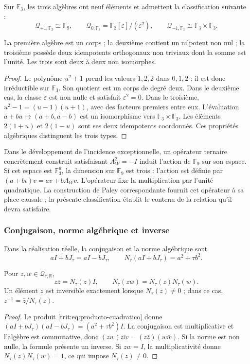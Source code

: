 Sur \(\mathbb F_3\), les trois algèbres ont neuf éléments et admettent
la classification suivante :
\[
 \mathcal Q_{+1,\mathbb F_3}\cong\mathbb F_9,\qquad
 \mathcal Q_{0,\mathbb F_3}=\mathbb F_3[\varepsilon]/(\varepsilon^2),
 \qquad
 \mathcal Q_{-1,\mathbb F_3}\cong\mathbb F_3\times\mathbb F_3.
\]

\begin{proposicion}
\label{trit:prop:tres-tipos}
La première algèbre est un corps ; la deuxième contient un nilpotent non
nul ; la troisième possède deux idempotents orthogonaux non triviaux dont la
somme est l'unité. Les trois sont deux à deux non isomorphes.
\end{proposicion}
\begin{proof}
Le polynôme \(u^2+1\) prend les valeurs \(1,2,2\) dans \(0,1,2\) ;
il est donc irréductible sur \(\mathbb F_3\). Son quotient est un
corps de degré deux. Dans le deuxième cas, la classe \(\varepsilon\) est
non nulle et satisfait \(\varepsilon^2=0\). Dans le troisième,
\(u^2-1=(u-1)(u+1)\), avec des facteurs premiers entre eux. L'évaluation
\(a+bu\mapsto(a+b,a-b)\) est un isomorphisme vers
\(\mathbb F_3\times\mathbb F_3\). Les éléments
\(2(1+u)\) et \(2(1-u)\) sont ses deux idempotents coordonnés.
Ces propriétés algébriques distinguent les trois types.
\end{proof}

Dans le développement de l'incidence exceptionnelle, un opérateur ternaire
concrètement construit satisfaisant \(A_W^2=-I\) induit l'action de
\(\mathbb F_9\) sur son espace. Si cet espace est \(\mathbb F_3^6\),
la dimension sur \(\mathbb F_9\) est trois : l'action est définie par
\((a+b\iota)v=av+bA_Wv\). L'opérateur fixe la multiplication par
l'unité quadratique. La construction de Paley correspondante fournit cet
opérateur à sa place causale ; la présente classification établit le
contenu de la relation qu'il devra satisfaire.

\subsubsection{Conjugaison, norme algébrique et inverse}

Dans la réalisation réelle, la conjugaison et la norme algébrique sont
\[
 \overline{aI+bJ_\tau}=aI-bJ_\tau,\qquad
 N_\tau(aI+bJ_\tau)=a^2+\tau b^2.
\]

\begin{proposicion}
\label{trit:prop:norma}
Pour \(z,w\in\mathcal Q_{\tau,\mathbb R}\),
\[
 z\bar z=N_\tau(z)I,
 \qquad N_\tau(zw)=N_\tau(z)N_\tau(w).
\]
Un élément \(z\) est inversible exactement lorsque \(N_\tau(z)\ne0\) ;
dans ce cas, \(z^{-1}=\bar z/N_\tau(z)\).
\end{proposicion}
\begin{proof}
Le produit \eqref{trit:eq:producto-cuadratico} donne
\((aI+bJ_\tau)(aI-bJ_\tau)=(a^2+\tau b^2)I\).
La conjugaison est multiplicative et l'algèbre est commutative, donc
\((zw)\overline{zw}=(z\bar z)(w\bar w)\). Si la norme est non nulle,
la formule présente un inverse. Si \(zw=I\), la multiplicativité donne
\(N_\tau(z)N_\tau(w)=1\), ce qui impose \(N_\tau(z)\ne0\).
\end{proof}

